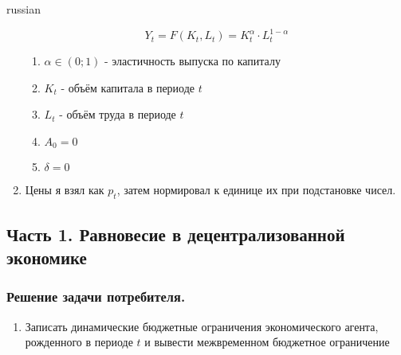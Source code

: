 \documentclass[fleqn]{article}
\begin{document}
\begin{otherlanguage*}{russian}
\begin{enumerate}
$$ Y_t = F(K_t, L_t) = K^\alpha_t \cdot L_t^{1- \alpha}  $$
\begin{enumerate}
\item $ \alpha \in (0; 1) $ - эластичность выпуска по капиталу 
\item $ K_t $ - объём капитала в периоде $ t $ 
\item $ L_t $ - объём труда в периоде $ t $ 
\item $ A_0 = 0 $
\item $ \delta = 0 $ 
\end{enumerate}
\item Цены я взял как $ p_t$, затем нормировал к единице их при подстановке чисел.
\end{enumerate}
\subsection*{Часть 1. Равновесие в децентрализованной экономике}
\subsubsection*{Решение задачи потребителя.}
\begin{enumerate}[label=\alph*), leftmargin=*]
\item Записать динамические бюджетные ограничения экономического агента, рожденного в периоде $ t $ и вывести межвременном бюджетное ограничение


\end{enumerate}
\end{otherlanguage*}
\end{document}
